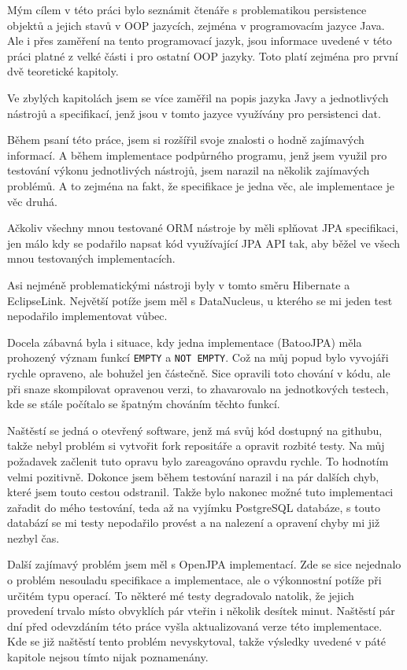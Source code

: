 Mým cílem v této práci bylo seznámit čtenáře s problematikou persistence objektů a jejich stavů v OOP jazycích, zejména v programovacím jazyce Java. Ale i přes zaměření na tento programovací jazyk, jsou informace uvedené v této práci platné z velké části i pro ostatní OOP jazyky. Toto platí zejména pro první dvě teoretické kapitoly.

Ve zbylých kapitolách jsem se více zaměřil na popis jazyka Javy a jednotlivých nástrojů a specifikací, jenž jsou v tomto jazyce využívány pro persistenci dat.

Během psaní této práce, jsem si rozšířil svoje znalosti o hodně zajímavých informací. A během implementace podpůrného programu, jenž jsem využil pro testování výkonu jednotlivých nástrojů, jsem narazil na několik zajímavých problémů. A to zejména na fakt, že specifikace je jedna věc, ale implementace je věc druhá.

Ačkoliv všechny mnou testované ORM nástroje by měli splňovat JPA specifikaci, jen málo kdy se podařilo napsat kód využívající JPA API tak, aby běžel ve všech mnou testovaných implementacích.

Asi nejméně problematickými nástroji byly v tomto směru Hibernate a EclipseLink. Největší potíže jsem měl s DataNucleus, u kterého se mi jeden test nepodařilo implementovat vůbec.

Docela zábavná byla i situace, kdy jedna implementace (BatooJPA) měla prohozený význam funkcí \texttt{EMPTY} a \texttt{NOT EMPTY}. Což na můj popud bylo vyvojáři rychle opraveno, ale bohužel jen částečně. Sice opravili toto chování v kódu, ale při snaze skompilovat opravenou verzi, to zhavarovalo na jednotkových testech, kde se stále počítalo se špatným chováním těchto funkcí.

Naštěstí se jedná o otevřený software, jenž má svůj kód dostupný na githubu, takže nebyl problém si vytvořit fork repositáře a opravit rozbité testy. Na můj požadavek začlenit tuto opravu bylo zareagováno opravdu rychle. To hodnotím velmi pozitivně. Dokonce jsem během testování narazil i na pár dalších chyb, které jsem touto cestou odstranil. Takže bylo nakonec možné tuto implementaci zařadit do mého testování, teda až na vyjímku PostgreSQL databáze, s touto databází se mi testy nepodařilo provést a na nalezení a opravení chyby mi již nezbyl čas.

Další zajímavý problém jsem měl s OpenJPA implementací. Zde se sice nejednalo o problém nesouladu specifikace a implementace, ale o výkonnostní potíže při určitém typu operací. To některé mé testy degradovalo natolik, že jejich provedení trvalo místo obvyklích pár vteřin i několik desítek minut. Naštěstí pár dní před odevzdáním této práce vyšla aktualizovaná verze této implementace. Kde se již naštěstí tento problém nevyskytoval, takže výsledky uvedené v páté kapitole nejsou tímto nijak poznamenány.

